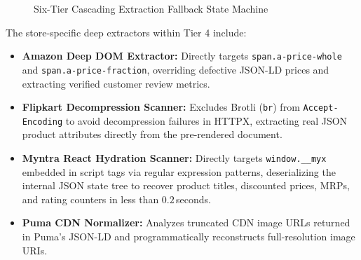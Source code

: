 \documentclass[12pt,a4paper,oneside]{report}
\begin{document}
\begin{figure}[h!]
\centering
{}
\caption{Six-Tier Cascading Extraction Fallback State Machine}
\label{fig:cascade}
\end{figure}

The store-specific deep extractors within Tier 4 include:
\begin{itemize}
    \item \textbf{Amazon Deep DOM Extractor:} Directly targets \texttt{span.a-price-whole} and \texttt{span.a-price-fraction}, overriding defective JSON-LD prices and extracting verified customer review metrics.
    \item \textbf{Flipkart Decompression Scanner:} Excludes Brotli (\texttt{br}) from \texttt{Accept-Encoding} to avoid decompression failures in HTTPX, extracting real JSON product attributes directly from the pre-rendered document.
    \item \textbf{Myntra React Hydration Scanner:} Directly targets \texttt{window.\_\_myx} embedded in script tags via regular expression patterns, deserializing the internal JSON state tree to recover product titles, discounted prices, MRPs, and rating counters in less than $0.2$\,seconds.
    \item \textbf{Puma CDN Normalizer:} Analyzes truncated CDN image URLs returned in Puma's JSON-LD and programmatically reconstructs full-resolution image URIs.
\end{itemize}
\end{document}
